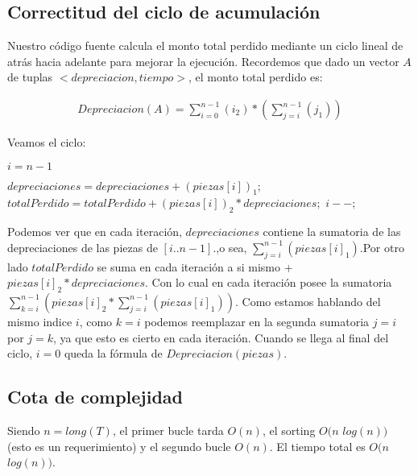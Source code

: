 \subsection{Correctitud del ciclo de acumulaci\'on}

Nuestro c\'odigo fuente calcula el monto total perdido mediante un ciclo lineal de atr\'as hacia adelante para mejorar la ejecuci\'on. Recordemos que dado un vector $A$ de tuplas  $< depreciacion, tiempo>$, el monto total perdido es:

\begin{align*}
Depreciacion(A) = \sum_{i=0}^{n-1}(i_2)*(\sum_{j=i}^{n-1}(j_1))
\end{align*}

Veamos el ciclo:

\begin{algorithmic}
\State $i = n-1$
	
		\State $depreciaciones = depreciaciones + (piezas[i])_1;$
		\State $totalPerdido = totalPerdido + (piezas[i])_2*depreciaciones;$
		\State $i--;$
	\EndWhile
\end{algorithmic}

Podemos ver que en cada iteraci\'on, $depreciaciones$ contiene la sumatoria de las depreciaciones de las piezas de $[i..n-1].$,o sea, $\sum_{j=i}^{n-1}(piezas[i]_1)$.Por otro lado $totalPerdido$ se suma en cada iteraci\'on a si mismo + $piezas[i]_2*depreciaciones$. Con lo cual en cada iteraci\'on posee la sumatoria $\sum_{k=i}^{n-1}(piezas[i]_2*\sum_{j=i}^{n-1}(piezas[i]_1))$. Como estamos hablando del mismo indice $i$, como  $k=i$ podemos reemplazar en la segunda sumatoria $j=i$ por $j=k$, ya que esto es cierto en cada iteraci\'on.  Cuando se llega al final del ciclo, $i= 0$ queda la f\'ormula de $Depreciacion(piezas).$


\subsection{Cota de complejidad}

Siendo $n=long(T)$, el primer bucle tarda $O(n)$, el sorting $O(n$ $log (n))$ (esto es un requerimiento) y el segundo bucle $O(n)$. El tiempo total es $O(n$ $log (n))$.
